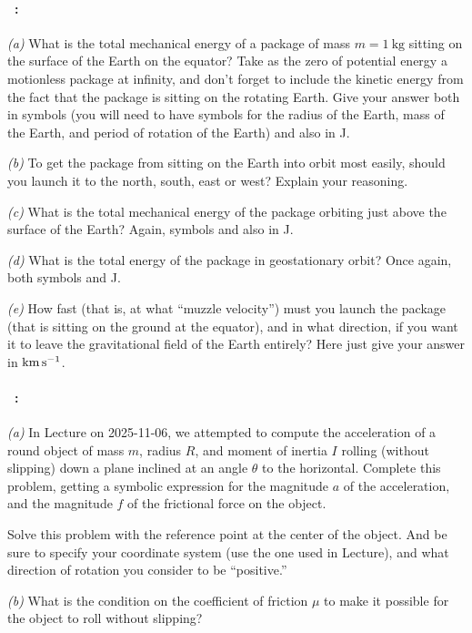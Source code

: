 \documentclass[12pt]{article}
\begin{document}
\paragraph{\problemname~\theproblem:}\label{rocket}%
\textsl{(a)} What is the total mechanical energy of a package of mass
$m= 1~\mathrm{kg}$ sitting on the surface of the Earth on the equator?
Take as the zero of potential energy a motionless package at infinity,
and don't forget to include the kinetic energy from the fact that the
package is sitting on the rotating Earth.  Give your answer both in
symbols (you will need to have symbols for the radius of the Earth,
mass of the Earth, and period of rotation of the Earth) and also in J.

\textsl{(b)} To get the package from sitting on the Earth into orbit most
easily, should you launch it to the north, south, east or west?
Explain your reasoning.

\textsl{(c)} What is the total mechanical energy of the package orbiting just
above the surface of the Earth? Again, symbols and also in J.

\textsl{(d)} What is the total energy of the package in geostationary
orbit? Once again, both symbols and J.

\textsl{(e)} How fast (that is, at what ``muzzle velocity'') must you launch
the package (that is sitting on the ground at the equator), and in what direction, if
you want it to leave the gravitational field of the Earth entirely?
Here just give your answer in $\mathrm{km}\,\mathrm{s}^{-1}$.

\paragraph{\problemname~\theproblem:}\label{rollingdown}%
\textsl{(a)}
In Lecture on 2025-11-06, we attempted to compute the acceleration of
a round object of mass $m$, radius $R$, and moment of inertia $I$
rolling (without slipping) down a plane inclined at an angle $\theta$
to the horizontal. Complete this problem, getting a symbolic
expression for the magnitude $a$ of the acceleration, and the magnitude
$f$ of the frictional force on the object.

Solve this problem with the reference point at the center of the object.
And be sure to specify your coordinate system (use the one
used in Lecture), and what direction of rotation you consider to be
``positive.''

\textsl{(b)}
What is the condition on the coefficient of friction $\mu$ to make it
possible for the object to roll without slipping?
\end{document}
